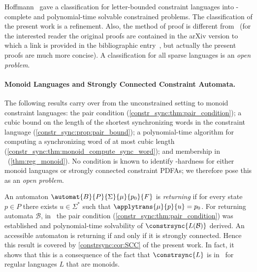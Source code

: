 Hoffmann~\cite{DBLP:conf/fct/Hoffmann21} gave a classification for letter-bounded constraint languages
into \NP-complete and polynomial-time solvable constrained problems.
The classification of the present work is a refinement.
Also, the method of proof is different from~\cite{DBLP:conf/fct/Hoffmann21} (for the interested reader 
the original proofs are contained in the arXiv version to which a link is provided in the bibliographic entry~\cite{DBLP:conf/fct/Hoffmann21}, but actually the present
proofs are much more concise). 
A classification for all sparse languages is an \emph{open problem}.
\begin{center}
\end{center}

\paragraph{Monoid Languages and Strongly Connected Constraint Automata.} 
The following results carry over from the unconstrained setting to monoid constraint languages: the pair condition (\cref{constr_sync:thm:pair_condition}); a cubic bound on the length of the shortest synchronizing words in the constraint language (\cref{constr_sync:prop:pair_bound}); a polynomial-time algorithm for computing a synchronizing word of at most cubic length (\cref{constr_sync:thm:monoid_compute_sync_word}); and membership in \NL\ (\cref{thm:reg_monoid}).
No condition is known to identify \NL-hardness for either monoid languages or strongly connected constraint PDFAs; we therefore pose this as an \emph{open problem}.

\begin{center}
\end{center}

An automaton $\automat{B}{P}{\Sigma}{\mu}{p_0}{F}$ is \emph{returning} if for every state $p \in P$ 
there exists $u \in \Sigma^*$ such that $\applytrans{\mu}{p}{u} = p_0$.
For returning automata $\mathcal B$, in~\cite[Lem. 16 \& Thm.~17]{FernauGHHVW19} the pair condition (\cref{constr_sync:thm:pair_condition})
was established and polynomial-time solvability of $\constrsync{L(\mathcal B)}$ derived.
An accessible automaton
is returning if and only if it is strongly connected. Hence this result is
covered by \cref{constrsync:cor:SCC} of the present work.
In fact, it shows that this is a consequence of the fact that $\constrsync{L}$
is in \NL\ for regular languages $L$ that are monoids.

